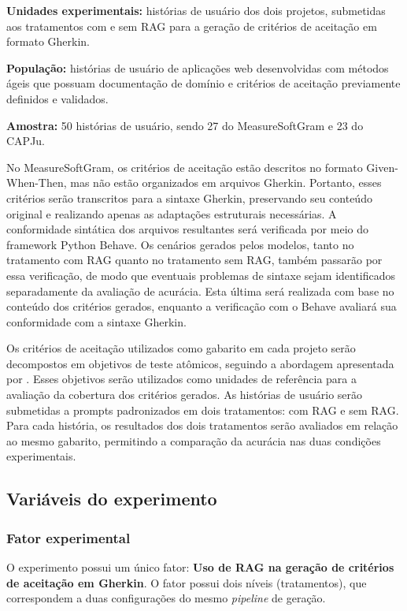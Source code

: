 \textbf{Unidades experimentais:} histórias de usuário dos dois projetos, submetidas aos tratamentos com e sem RAG para a geração de critérios de aceitação em formato Gherkin.

\textbf{População:} histórias de usuário de aplicações web desenvolvidas com métodos ágeis que possuam documentação de domínio e critérios de aceitação previamente definidos e validados.

\textbf{Amostra:} 50 histórias de usuário, sendo 27 do MeasureSoftGram e 23 do CAPJu.

No MeasureSoftGram, os critérios de aceitação estão descritos no formato Given-When-Then, mas não estão organizados em arquivos Gherkin. Portanto, esses critérios serão transcritos para a sintaxe Gherkin, preservando seu conteúdo original e realizando apenas as adaptações estruturais necessárias. A conformidade sintática dos arquivos resultantes será verificada por meio do framework Python Behave. Os cenários gerados pelos modelos, tanto no tratamento com RAG quanto no tratamento sem RAG, também passarão por essa verificação, de modo que eventuais problemas de sintaxe sejam identificados separadamente da avaliação de acurácia. Esta última será realizada com base no conteúdo dos critérios gerados, enquanto a verificação com o Behave avaliará sua conformidade com a sintaxe Gherkin.

Os critérios de aceitação utilizados como gabarito em cada projeto serão decompostos em objetivos de teste atômicos, seguindo a abordagem apresentada por \cite{wang2025}. Esses objetivos serão utilizados como unidades de referência para a avaliação da cobertura dos critérios gerados. As histórias de usuário serão submetidas a prompts padronizados em dois tratamentos: com RAG e sem RAG. Para cada história, os resultados dos dois tratamentos serão avaliados em relação ao mesmo gabarito, permitindo a comparação da acurácia nas duas condições experimentais.

\subsection{Variáveis do experimento}

\subsubsection*{Fator experimental}
O experimento possui um único fator: \textbf{Uso de RAG na geração de critérios de aceitação em Gherkin}. O fator possui dois níveis (tratamentos), que correspondem a duas configurações do mesmo \textit{pipeline} de geração.

